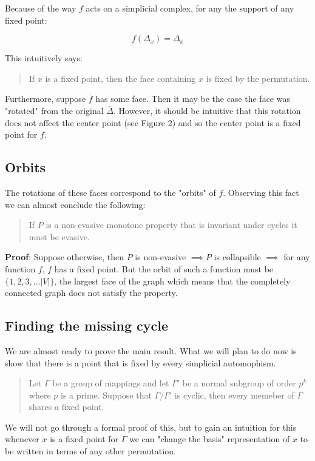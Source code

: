 \documentclass[a4paper]{article}
\newcommand{\ol}{\overline}
\begin{document}
Because of the way $f$ acts on a simplicial complex, for any the support of any fixed point:

$$f(\Delta_{x}) = \Delta_x$$

This intuitively says:

\begin{quote}
    If $x$ is a fixed point, then the face containing $x$ is fixed by the permutation.
\end{quote}

Furthermore, suppose $\ol{f}$ has some face. Then it may be the case the face was "rotated" from the original $\ol{\Delta}$. However, it should be intuitive that this rotation does not affect the center point (see Figure 2) and so the center point is a fixed point for $f$.

\subsection{Orbits}

The rotations of these faces correspond to the "orbits" of $f$. Observing this fact we can almost conclude the following:

\begin{quote}
    If $P$ is a non-evasive monotone property that is invariant under cycles it must be evasive.
\end{quote}

\textbf{Proof}: Suppose otherwise, then $P$ is non-evasive $\implies P$ is collapsible $\implies$ for any function $f$, $f$ has a fixed point. But the orbit of such a function must be $\{1, 2, 3, \ldots |V| \}$, the largest face of the graph which means that the completely connected graph does not satisfy the property.

\subsection{Finding the missing cycle}

We are almost ready to prove the main result. What we will plan to do now is show that there is a point that is fixed by every simplicial automophism.

\begin{quote}
    Let $\Gamma$ be a group of mappings and let $\Gamma'$ be a normal subgroup of order $p^k$ where $p$ is a prime. Suppose that $\Gamma/\Gamma'$ is cyclic, then every memeber of $\Gamma$ shares a fixed point.
\end{quote}

We will not go through a formal proof of this, but to gain an intuition for this whenever $x$ is a fixed point for $\Gamma$ we can "change the basis" representation of $x$ to be written in terms of any other permutation.
\end{document}
